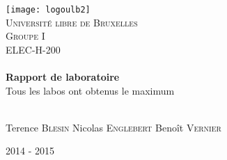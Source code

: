 \begin{titlepage}
\begin{center}

\texttt{[image: logoulb2]}~\\[1cm]

\textsc{\LARGE Université libre de Bruxelles}\\[1.5cm]

\textsc{\Large Groupe I}\\[1cm]
\textsc{\LARGE ELEC-H-200}\\[0.5cm]
\HRule \\[0.4cm]
{ \LARGE \textbf{Rapport de laboratoire}\\ Tous les labos ont obtenus le maximum }

\HRule \\[1cm]
Terence \textsc{Blesin}\hspace{1cm}  Nicolas \textsc{Englebert}\hspace{1cm}  Benoît \textsc{Vernier}
\vfill

{\large 2014 - 2015}



\end{center}
\end{titlepage}